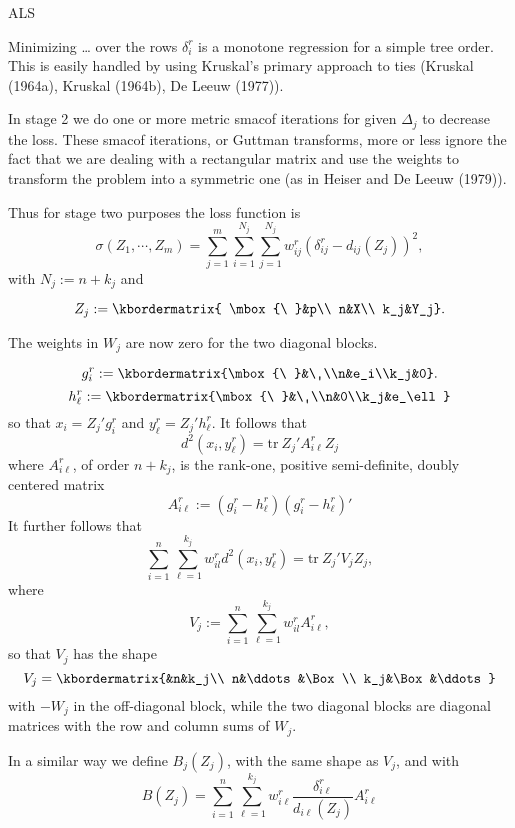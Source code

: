 \documentclass[
  12pt,
]{article}
\begin{document}
ALS

Minimizing \ldots{} over the rows \(\delta_i^r\) is a monotone regression for a simple tree order. This is easily handled by using Kruskal's primary approach
to ties (Kruskal (1964a), Kruskal (1964b), De Leeuw (1977)).

In stage 2 we do one or more metric smacof iterations for given \(\Delta_j\)
to decrease the loss. These smacof iterations, or Guttman transforms, more or less ignore the fact that we are dealing with a rectangular matrix and use the weights to transform the problem into a symmetric one (as in Heiser and De Leeuw (1979)).

Thus for stage two purposes the loss function is
\[
\sigma(Z_1,\cdots,Z_m)=\sum_{j=1}^m\sum_{i=1}^{N_j}\sum_{j=1}^{N_j}w_{ij}^r(\delta_{ij}^r-d_{ij}(Z_j))^2,
\]
with \(N_j:=n+k_j\) and

\[
Z_j:=\kbordermatrix{
\mbox{\ }&p\\
n&X\\
k_j&Y_j}.
\]

The weights in \(W_j\) are now zero for the two diagonal blocks.

\[
g_i^r:=\kbordermatrix{\mbox{\ }&\ \\n&e_i\\k_j&0}.
\]
\[
h_\ell^r:=\kbordermatrix{\mbox{\ }&\ \\n&0\\k_j&e_\ell}
\]
so that \(x_i=Z_j'g_i^r\) and \(y_\ell^r=Z_j'h_\ell^r\). It follows that
\[
d^2(x_i,y_\ell^r)=\text{tr}\ Z_j'A^r_{i\ell}Z_j^{\ }
\]
where \(A_{i\ell}^r\), of order \(n+k_j\), is the rank-one, positive semi-definite, doubly centered matrix
\[
A_{i\ell}^r:=(g_i^r-h_\ell^r)(g_i^r-h_\ell^r)'
\]
It further follows that
\[
\sum_{i=1}^n\sum_{\ell=1}^{k_j}w_{il}^rd^2(x_i,y_\ell^r)=\text{tr}\ Z_j'V_jZ_j,
\]
where
\[
V_j:=\sum_{i=1}^n\sum_{\ell=1}^{k_j}w_{il}^rA^r_{i\ell},
\]
so that \(V_j\) has the shape
\[
V_j=\kbordermatrix{&n&k_j\\
n&\ddots&\Box\\
k_j&\Box&\ddots}
\]
with \(-W_j\) in the off-diagonal block, while the two diagonal
blocks are diagonal matrices with the row and column sums of \(W_j\).

In a similar way we define \(B_j(Z_j)\), with the same shape as \(V_j\), and with
\[
B(Z_j)=\sum_{i=1}^n\sum_{\ell=1}^{k_j}w_{i\ell}^r\frac{\delta_{i\ell}^r }{d_{i\ell}(Z_j)}A^r_{i\ell}
\]
\end{document}

